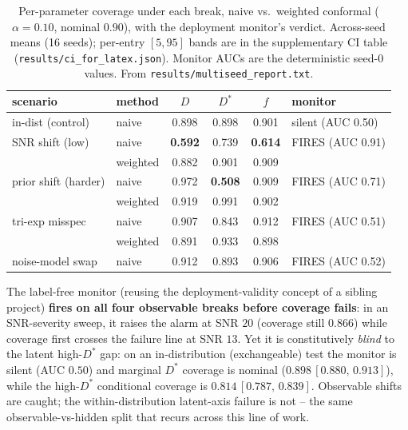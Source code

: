 \documentclass[11pt]{article}
\newcommand{\Dstar}{D^{*}}
\newcommand{\band}[2]{{\scriptsize\,$[#1,\,#2]$}}
\begin{document}
\begin{table}[t]
\centering
\caption{Per-parameter coverage under each break, naive vs.\ weighted conformal
($\alpha=0.10$, nominal $0.90$), with the deployment monitor's verdict. Across-seed
means (16 seeds); per-entry $[5,95]$ bands are in the supplementary CI table
(\texttt{results/ci\_for\_latex.json}). Monitor AUCs are the deterministic seed-0
values. From \texttt{results/multiseed\_report.txt}.}
\label{tab:shift}
\small
\begin{tabular}{llccc l}
\toprule
scenario & method & $D$ & $\Dstar$ & $f$ & monitor \\
\midrule
in-dist (control)   & naive    & 0.898 & 0.898 & 0.901 & silent (AUC 0.50) \\
SNR shift (low)      & naive    & \textbf{0.592} & 0.739 & \textbf{0.614} & FIRES (AUC 0.91) \\
                     & weighted & 0.882 & 0.901 & 0.909 & \\
prior shift (harder) & naive    & 0.972 & \textbf{0.508} & 0.909 & FIRES (AUC 0.71) \\
                     & weighted & 0.919 & 0.991 & 0.902 & \\
tri-exp misspec      & naive    & 0.907 & 0.843 & 0.912 & FIRES (AUC 0.51) \\
                     & weighted & 0.891 & 0.933 & 0.898 & \\
noise-model swap     & naive    & 0.912 & 0.893 & 0.906 & FIRES (AUC 0.52) \\
\bottomrule
\end{tabular}
\end{table}

The label-free monitor (reusing the deployment-validity concept of a sibling
project) \textbf{fires on all four observable breaks before coverage fails}: in an
SNR-severity sweep, it raises the alarm at SNR $20$ (coverage still $0.866$) while
coverage first crosses the failure line at SNR $13$. Yet it is constitutively
\emph{blind} to the latent high-$\Dstar$ gap: on an in-distribution (exchangeable)
test the monitor is silent (AUC $0.50$) and marginal $\Dstar$ coverage is nominal
($0.898$\band{0.880}{0.913}), while the high-$\Dstar$ conditional coverage is
$0.814$\band{0.787}{0.839}. Observable
shifts are caught; the within-distribution latent-axis failure is not -- the same
observable-vs-hidden split that recurs across this line of work.

\end{document}
